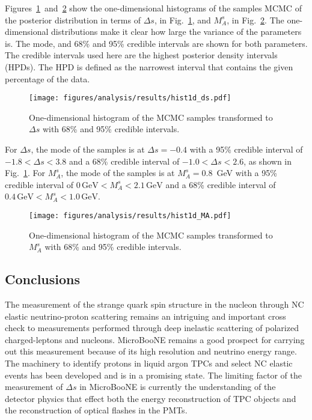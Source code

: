     Figures~\ref{fig:hist1dds}~and~\ref{fig:hist1dma} show the one-dimensional
    histograms of the samples MCMC of the posterior distribution in terms of
    $\Delta s$, in Fig.~\ref{fig:hist1dds}, and $M_A^s$, in
    Fig.~\ref{fig:hist1dma}. The one-dimensional distributions make it clear
    how large the variance of the parameters is. The mode, and 68\% and 95\%
    credible intervals are shown for both parameters. The credible intervals
    used here are the highest posterior density intervals (HPDs). The HPD is
    defined as the narrowest interval that contains the given percentage of the
    data.  \begin{figure}[h] \centering
    \texttt{[image: figures/analysis/results/hist1d\_ds.pdf]}
    \caption{One-dimensional histogram of the MCMC samples transformed to
    $\Delta s$ with 68\% and 95\% credible intervals.} \label{fig:hist1dds}
    \end{figure}

    For $\Delta s$, the mode of the samples is at $\Delta s = -0.4$ with a 95\%
    credible interval of $-1.8 < \Delta s < 3.8$ and a 68\% credible interval
    of $-1.0 < \Delta s < 2.6$, as shown in Fig.~\ref{fig:hist1dds}. For
    $M_A^s$, the mode of the samples is at $M_A^s = 0.8$~GeV with a 95\%
    credible interval of $0\, \textrm{GeV} < M_A^s < 2.1\, \textrm{GeV}$ and a
    68\% credible interval of $0.4\, \textrm{GeV} < M_A^s < 1.0\,
    \textrm{GeV}$.
    \begin{figure}[h]
      \centering
      \texttt{[image: figures/analysis/results/hist1d\_MA.pdf]} 
      \caption{One-dimensional histogram of the MCMC samples transformed to
      $M_A^s$ with 68\% and 95\% credible intervals.}
      \label{fig:hist1dma}
    \end{figure}
    
\subsection{Conclusions}
  The measurement of the strange quark spin structure in the nucleon through NC
  elastic neutrino-proton scattering remains an intriguing and important cross
  check to measurements performed through deep inelastic scattering of
  polarized charged-leptons and nucleons. MicroBooNE remains a good prospect
  for carrying out this measurement because of its high resolution and neutrino
  energy range. The machinery to identify protons in liquid argon TPCs and
  select NC elastic events has been developed and is in a promising state. The
  limiting factor of the measurement of $\Delta s$ in MicroBooNE is currently
  the understanding of the detector physics that effect both the energy
  reconstruction of TPC objects and the reconstruction of optical flashes in
  the PMTs.

